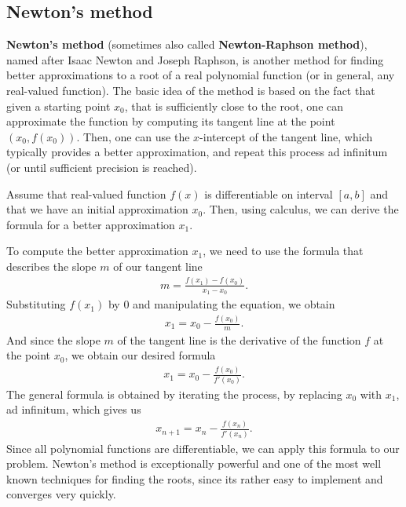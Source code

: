 \documentclass[
  digital, %
  table,   %
  nolof,     %
  nolot,     %
	draft, %
]{fithesis3}
\begin{document}
\subsection{Newton's method}
\textbf{Newton's method} (sometimes also called \textbf{Newton-Raphson method}), named after Isaac Newton and Joseph Raphson, is another method for finding better approximations to a root of a real polynomial function (or in general, any real-valued function). The basic idea of the method is based on the fact that given a starting point $x_{0}$, that is sufficiently close to the root, one can approximate the function by computing its tangent line at the point $(x_{0}, f(x_{0}))$. Then, one can use the $x$-intercept of the tangent line, which typically provides a better approximation, and repeat this process ad infinitum \parencite{rootApproxMeth} (or until sufficient precision is reached). 

Assume that real-valued function $f(x)$ is differentiable on interval $[a,b]$ and that we have an initial approximation $x_{0}$. Then, using calculus, we can derive the formula for a better approximation $x_{1}$.


To compute the better approximation $x_{1}$, we need to use the formula that describes the slope $m$ of our tangent line
\begin{align}
      m = \frac{f(x_{1}) - f(x_{0})}{x_{1} - x_{0}}.
\end{align}
Substituting $f(x_{1})$ by $0$ and manipulating the equation, we obtain
\begin{align}
      x_{1} = x_{0} - \frac{f(x_{0})}{m}.
\end{align}
And since the slope $m$ of the tangent line is the derivative of the function $f$ at the point $x_{0}$, we obtain our desired formula 
\begin{align}
      x_{1} = x_{0} - \frac{f(x_{0})}{f'(x_{0})}.
\end{align}
The general formula is obtained by iterating the process, by replacing $x_{0}$ with $x_{1}$, ad infinitum, which gives us 
\begin{align}
      x_{n+1} = x_{n} - \frac{f(x_{n})}{f'(x_{n})}. \label{eq:newt}
\end{align}
Since all polynomial functions are differentiable, we can apply this formula to our problem. Newton's method is exceptionally powerful and one of the most well known techniques for finding the roots, since its rather easy to implement and converges very quickly. 
\end{document}
